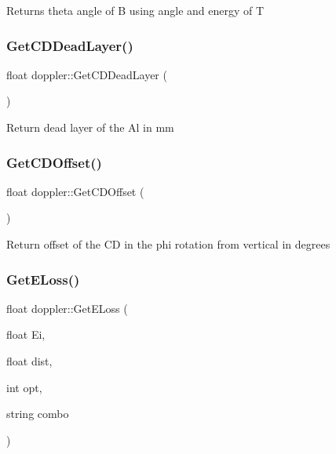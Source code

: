 Returns theta angle of B using angle and energy of T \mbox{\label{classdoppler_a2c1aef6db4ad3fc0c98e91d995992706}} 
\subsubsection{\texorpdfstring{Get\+C\+D\+Dead\+Layer()}{GetCDDeadLayer()}}
{\footnotesize\ttfamily float doppler\+::\+Get\+C\+D\+Dead\+Layer (\begin{DoxyParamCaption}{ }\end{DoxyParamCaption})}

Return dead layer of the Al in mm \mbox{\label{classdoppler_ac7725720fab82af5a5a6f02041bc9483}} 
\subsubsection{\texorpdfstring{Get\+C\+D\+Offset()}{GetCDOffset()}}
{\footnotesize\ttfamily float doppler\+::\+Get\+C\+D\+Offset (\begin{DoxyParamCaption}{ }\end{DoxyParamCaption})}

Return offset of the CD in the phi rotation from vertical in degrees \mbox{\label{classdoppler_a64570ec784dabd6e17cf836489450527}} 
\subsubsection{\texorpdfstring{Get\+E\+Loss()}{GetELoss()}}
{\footnotesize\ttfamily float doppler\+::\+Get\+E\+Loss (\begin{DoxyParamCaption}\item[{float}]{Ei,  }\item[{float}]{dist,  }\item[{int}]{opt,  }\item[{string}]{combo }\end{DoxyParamCaption})}

